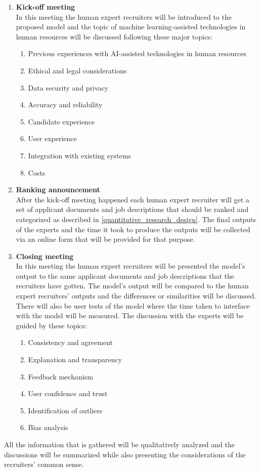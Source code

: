\documentclass[draft,final]{thesisclass} %
\begin{document}
\begin{enumerate}
    \item \textbf{Kick-off meeting}\\
    In this meeting the human expert recruiters will be introduced to the proposed model and the topic of machine learning-assisted technologies in human resources will be discussed following these major topics:
    \begin{enumerate}
        \item Previous experiences with AI-assisted technologies in human resources
        \item Ethical and legal considerations
        \item Data security and privacy
        \item Accuracy and reliability
        \item Candidate experience
        \item User experience
        \item Integration with existing systems
        \item Costs
    \end{enumerate} 
    \item \textbf{Ranking announcement}\\
    After the kick-off meeting happened each human expert recruiter will get a set of applicant documents and job descriptions that should be ranked and categorized as described in \ref{quantitative_research_design}.
    The final outputs of the experts and the time it took to produce the outputs will be collected via an online form that will be provided for that purpose.
    \item \textbf{Closing meeting}\\
    In this meeting the human expert recruiters will be presented the model's output to the same applicant documents and job descriptions that the recruiters have gotten.
    The model's output will be compared to the human expert recruiters' outputs and the differences or similarities will be discussed.
    There will also be user tests of the model where the time taken to interface with the model will be measured.
    The discussion with the experts will be guided by these topics:
    \begin{enumerate}
        \item Consistency and agreement
        \item Explanation and transparency
        \item Feedback mechanism
        \item User confidence and trust
        \item Identification of outliers
        \item Bias analysis
    \end{enumerate}
\end{enumerate}
All the information that is gathered will be qualitatively analyzed and the discussions will be summarized while also presenting the considerations of the recruiters' common sense.
\end{document}
